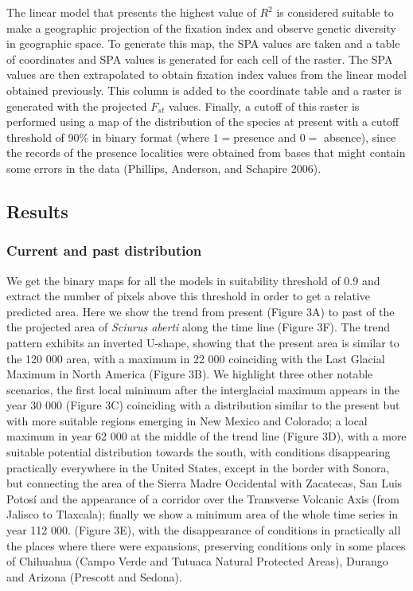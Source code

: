 \documentclass[
]{article}
\begin{document}
The linear model that presents the highest value of \(R^2\) is
considered suitable to make a geographic projection of the fixation
index and observe genetic diversity in geographic space. To generate
this map, the SPA values are taken and a table of coordinates and SPA
values is generated for each cell of the raster. The SPA values are then
extrapolated to obtain fixation index values from the linear model
obtained previously. This column is added to the coordinate table and a
raster is generated with the projected \(F_{st}\) values. Finally, a
cutoff of this raster is performed using a map of the distribution of
the species at present with a cutoff threshold of 90\% in binary format
(where \(1 =\)presence and \(0 =\) absence), since the records of the
presence localities were obtained from bases that might contain some
errors in the data (Phillips, Anderson, and Schapire 2006).

\hypertarget{results}{%
\subsection{Results}\label{results}}

\hypertarget{current-and-past-distribution}{%
\subsubsection{Current and past
distribution}\label{current-and-past-distribution}}

We get the binary maps for all the models in suitability threshold of
0.9 and extract the number of pixels above this threshold in order to
get a relative predicted area. Here we show the trend from present
(Figure 3A) to past of the the projected area of \emph{Sciurus aberti}
along the time line (Figure 3F). The trend pattern exhibits an inverted
U-shape, showing that the present area is similar to the 120 000 area,
with a maximum in 22 000 coinciding with the Last Glacial Maximum in
North America (Figure 3B). We highlight three other notable scenarios,
the first local minimum after the interglacial maximum appears in the
year 30 000 (Figure 3C) coinciding with a distribution similar to the
present but with more suitable regions emerging in New Mexico and
Colorado; a local maximum in year 62 000 at the middle of the trend line
(Figure 3D), with a more suitable potential distribution towards the
south, with conditions disappearing practically everywhere in the United
States, except in the border with Sonora, but connecting the area of the
Sierra Madre Occidental with Zacatecas, San Luis Potosí and the
appearance of a corridor over the Transverse Volcanic Axis (from Jalisco
to Tlaxcala); finally we show a minimum area of the whole time series in
year 112 000. (Figure 3E), with the disappearance of conditions in
practically all the places where there were expansions, preserving
conditions only in some places of Chihuahua (Campo Verde and Tutuaca
Natural Protected Areas), Durango and Arizona (Prescott and Sedona).
\end{document}
